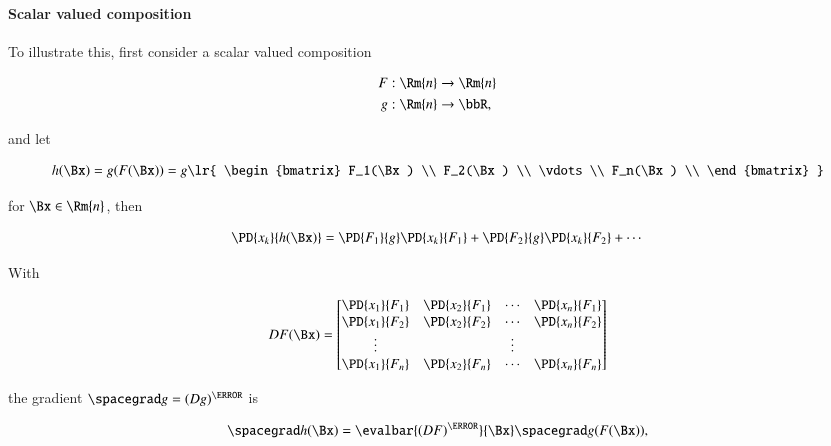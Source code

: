 \paragraph{Scalar valued composition}

To illustrate this, first consider a scalar valued composition

\begin{dmath}\label{eqn:jacobianAndHessian:584}
\begin{aligned}
F &: \Rm{n} \rightarrow \Rm{n} \\
g &: \Rm{n} \rightarrow \bbR,
\end{aligned}
\end{dmath}

and let

\begin{dmath}\label{eqn:jacobianAndHessian:604}
h(\Bx)
= g(F(\Bx))
= g\lr{
\begin{bmatrix}
F_1(\Bx) \\
F_2(\Bx) \\
\vdots \\
F_n(\Bx) \\
\end{bmatrix}
}
\end{dmath}

for \( \Bx \in \Rm{n} \), then

\begin{dmath}\label{eqn:jacobianAndHessian:624}
\PD{x_k}{h(\Bx)}
=
\PD{F_1}{g}
\PD{x_k}{F_1}
+
\PD{F_2}{g}
\PD{x_k}{F_2}
+
\cdots
\end{dmath}

With

\begin{dmath}\label{eqn:jacobianAndHessian:644}
D F(\Bx)
=
\begin{bmatrix}
\PD{x_1}{F_1} & \PD{x_2}{F_1} & \cdots & \PD{x_n}{F_1} \\
\PD{x_1}{F_2} & \PD{x_2}{F_2} & \cdots & \PD{x_n}{F_2} \\
\vdots & & \vdots & \\
\PD{x_1}{F_n} & \PD{x_2}{F_n} & \cdots & \PD{x_n}{F_n} \\
\end{bmatrix}
\end{dmath}

the gradient \( \spacegrad g = (D g)^\T \) is

\begin{dmath}\label{eqn:jacobianAndHessian:664}
\spacegrad h(\Bx)
=
\evalbar{ (D F)^\T }{\Bx}
\spacegrad g(F(\Bx)),
\end{dmath}

